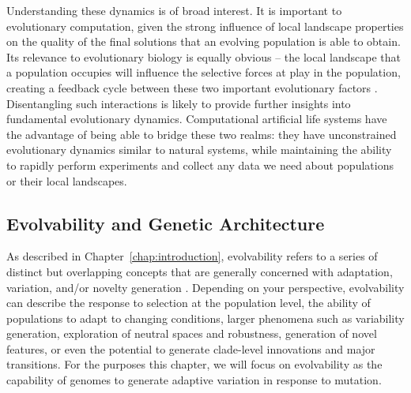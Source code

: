 \documentclass[PhD]{msu-thesis}
\begin{document}
Understanding these dynamics is of broad interest.  It is important to evolutionary computation, given the strong influence of local landscape properties on the quality of the final solutions that an evolving population is able to obtain. Its relevance to evolutionary biology is equally obvious -- the local landscape that a population occupies will influence the selective forces at play in the population, creating a feedback cycle between these two important evolutionary factors \cite{zaman_coevolution_2014,meyer_repeatability_2012}. Disentangling such interactions is likely to provide further insights into fundamental evolutionary dynamics.  Computational artificial life systems have the advantage of being able to bridge these two realms: they have unconstrained evolutionary dynamics similar to natural systems, while maintaining the ability to rapidly perform experiments and collect any data we need about populations or their local landscapes.
%
%
%
%
%
%

\subsection{Evolvability and Genetic Architecture}
As described in Chapter~\ref{chap:introduction}, evolvability refers to a series of distinct but overlapping concepts that are generally concerned with adaptation, variation, and/or novelty generation \cite{pigliucci_is_2008}. Depending on your perspective, evolvability can describe the response to selection at the population level\cite{fisher_genetical_1930,houle_comparing_1992}, the ability of populations to adapt to changing conditions\cite{belle_code_2002}, larger phenomena such as variability generation\cite{gunter_p._wagner_perspective:_1996}, 
exploration of neutral spaces and robustness\cite{andreas_wagner_robustness_2005,kitano_biological_2004}, 
generation of novel features\cite{alberch_genes_1991,brookfield_evolution:_2001}, 
or even the potential to generate clade-level innovations\cite{kirschner_evolvability_1998} 
and major transitions\cite{smith_major_1995}. For the purposes this chapter, we will focus on evolvability as the capability of genomes to generate adaptive variation in response to mutation. 
\end{document}
